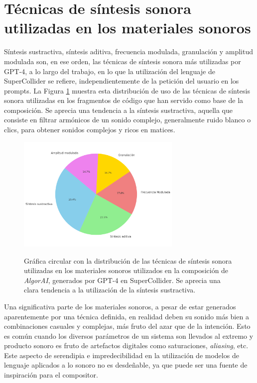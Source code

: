 \section{Técnicas de síntesis sonora utilizadas en los materiales sonoros}

Síntesis sustractiva, síntesis aditiva, frecuencia modulada, granulación y amplitud modulada son, en ese orden, las técnicas de síntesis sonora más utilizadas por GPT-4, a lo largo del trabajo, en lo que la utilización del lenguaje de SuperCollider se refiere, independientemente de la petición del usuario en los prompts. La Figura \ref{fig:grafica_sintesis_gpt4} muestra esta distribución de uso de las técnicas de síntesis sonora utilizadas en los fragmentos de código que han servido como base de la composición. Se aprecia una tendencia a la síntesis sustractiva, aquella que consiste en filtrar armónicos de un sonido complejo, generalmente ruido blanco o clics, para obtener sonidos complejos y ricos en matices.

\begin{figure}[H]
    \caption[Gráfica circular con la distribución de las técnicas de síntesis sonora utilizadas en los materiales sonoros generados por GPT-4 en SuperCollider]{Gráfica circular con la distribución de las técnicas de síntesis sonora utilizadas en los materiales sonoros utilizados en la composición de \emph{AlgorAI}, generados por GPT-4 en SuperCollider. Se aprecia una clara tendencia a la utilización de la síntesis sustractiva.}
    \centering
    \includegraphics[width=0.7\textwidth]{./figuras/grafica_sintesis_gpt4_quesitos.png}
    \source{\propio}
    \label{fig:grafica_sintesis_gpt4}
\end{figure}

Una significativa parte de los materiales sonoros, a pesar de estar generados aparentemente por una técnica definida, en realidad deben su sonido más bien a combinaciones casuales y complejas, más fruto del azar que de la intención. Esto es común cuando los diversos parámetros de un sistema son llevados al extremo y producto sonoro es fruto de artefactos digitales como saturaciones, \emph{aliasing}, etc. Este aspecto de serendipia e impredecibilidad en la utilización de modelos de lenguaje aplicados a lo sonoro no es desdeñable, ya que puede ser una fuente de inspiración para el compositor.

